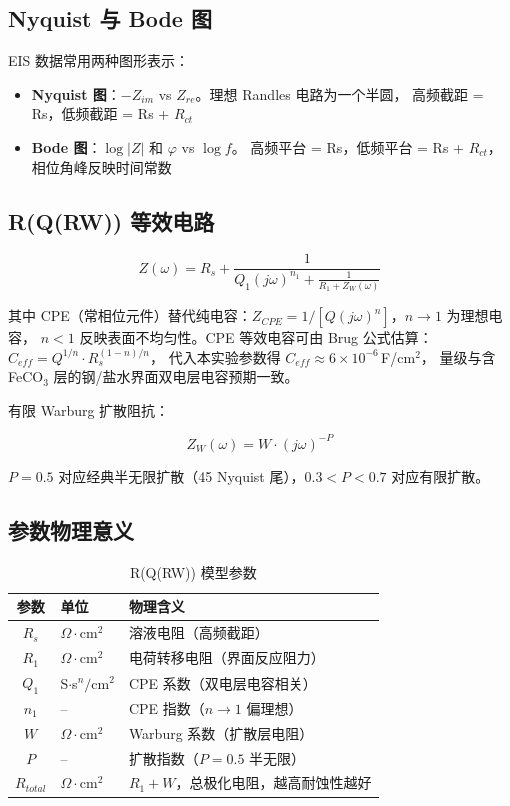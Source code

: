 \documentclass[12pt,a4paper]{ctexart}
\begin{document}
\subsection{Nyquist 与 Bode 图}

EIS 数据常用两种图形表示：

\begin{itemize}[leftmargin=1.5cm]
  \item \textbf{Nyquist 图}：$-Z_{im}$ vs $Z_{re}$。理想 Randles 电路为一个半圆，
  高频截距 = Rs，低频截距 = Rs + $R_{ct}$
  \item \textbf{Bode 图}：$\log|Z|$ 和 $\varphi$ vs $\log f$。
  高频平台 = Rs，低频平台 = Rs + $R_{ct}$，相位角峰反映时间常数
\end{itemize}

\subsection{R(Q(RW)) 等效电路}

\begin{equation}
Z(\omega) = R_s + \frac{1}{Q_1(j\omega)^{n_1} + \frac{1}{R_1 + Z_W(\omega)}}
\end{equation}

其中 CPE（常相位元件）替代纯电容：$Z_{CPE} = 1/[Q(j\omega)^n]$，$n \rightarrow 1$ 为理想电容，
$n < 1$ 反映表面不均匀性。CPE 等效电容可由 Brug 公式估算\cite{hsu2001}：
$C_{eff} = Q^{1/n} \cdot R_s^{(1-n)/n}$，
代入本实验参数得 $C_{eff} \approx 6\times10^{-6}$\,F/cm$^2$，
量级与含 FeCO$_3$ 层的钢/盐水界面双电层电容预期一致。

有限 Warburg 扩散阻抗：

\begin{equation}
Z_W(\omega) = W \cdot (j\omega)^{-P}
\end{equation}

$P = 0.5$ 对应经典半无限扩散（45\textdegree{} Nyquist 尾），$0.3 < P < 0.7$ 对应有限扩散。

\subsection{参数物理意义}

\begin{table}[h]\centering
\caption{R(Q(RW)) 模型参数}\begin{tabular}{cll}
\toprule
参数 & 单位 & 物理含义 \\
\midrule
$R_s$ & $\Omega\!\cdot\!$cm$^2$ & 溶液电阻（高频截距）\\
$R_1$ & $\Omega\!\cdot\!$cm$^2$ & 电荷转移电阻（界面反应阻力）\\
$Q_1$ & S$\cdot$s$^n/$cm$^2$ & CPE 系数（双电层电容相关）\\
$n_1$ & -- & CPE 指数（$n \rightarrow 1$ 偏理想）\\
$W$ & $\Omega\!\cdot\!$cm$^2$ & Warburg 系数（扩散层电阻）\\
$P$ & -- & 扩散指数（$P=0.5$ 半无限）\\
$R_{total}$ & $\Omega\!\cdot\!$cm$^2$ & $R_1 + W$，总极化电阻，越高耐蚀性越好\\
\bottomrule
\end{tabular}
\end{table}
\end{document}
